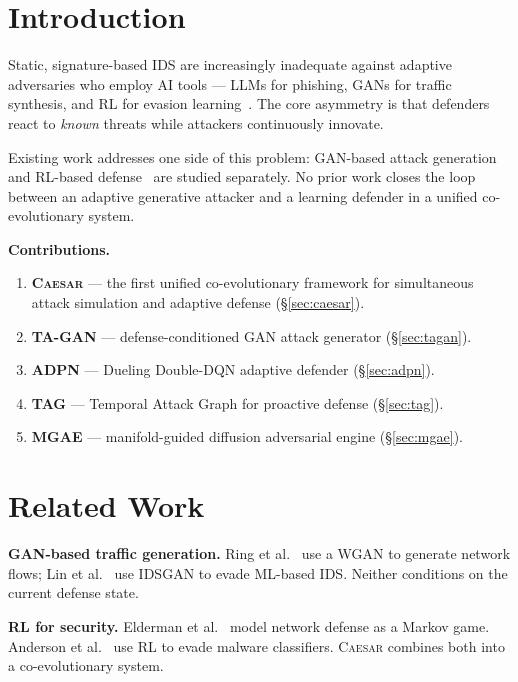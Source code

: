 \documentclass[conference]{IEEEtran}
\newcommand{\caesar}{\textsc{Caesar}}
\newcommand{\tagan}{\textsc{TA-GAN}}
\newcommand{\adpn}{\textsc{ADPN}}
\newcommand{\tagraph}{\textsc{TAG}}
\newcommand{\mgae}{\textsc{MGAE}}
\begin{document}
\section{Introduction}

Static, signature-based IDS are increasingly inadequate against
adaptive adversaries who employ AI tools — LLMs for phishing,
GANs for traffic synthesis, and RL for evasion learning~\cite{anderson2018}.
The core asymmetry is that defenders react to \emph{known} threats while
attackers continuously innovate.

Existing work addresses one side of this problem:
GAN-based attack generation~\cite{ring2019,lin2018} and RL-based
defense~\cite{elderman2017} are studied separately.
No prior work closes the loop between an adaptive generative attacker
and a learning defender in a unified co-evolutionary system.

\textbf{Contributions.}
\begin{enumerate}
  \item \textbf{\caesar{}} — the first unified co-evolutionary framework for
    simultaneous attack simulation and adaptive defense (\S\ref{sec:caesar}).
  \item \textbf{\tagan{}} — defense-conditioned GAN attack generator (\S\ref{sec:tagan}).
  \item \textbf{\adpn{}} — Dueling Double-DQN adaptive defender (\S\ref{sec:adpn}).
  \item \textbf{\tagraph{}} — Temporal Attack Graph for proactive defense (\S\ref{sec:tag}).
  \item \textbf{\mgae{}} — manifold-guided diffusion adversarial engine (\S\ref{sec:mgae}).
\end{enumerate}

\section{Related Work}

\textbf{GAN-based traffic generation.}
Ring et al.~\cite{ring2019} use a WGAN to generate network flows;
Lin et al.~\cite{lin2018} use IDSGAN to evade ML-based IDS.
Neither conditions on the current defense state.

\textbf{RL for security.}
Elderman et al.~\cite{elderman2017} model network defense as a Markov game.
Anderson et al.~\cite{anderson2018} use RL to evade malware classifiers.
\caesar{} combines both into a co-evolutionary system.
\end{document}
